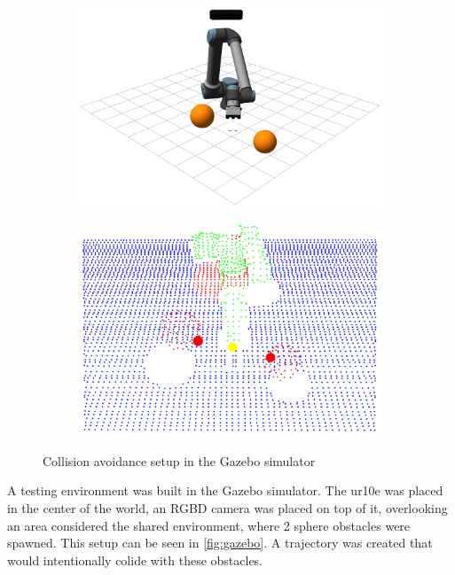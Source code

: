 \begin{figure}[h]
    \centering
    \begin{subfigure}{.5\linewidth}
      \centering
      \includegraphics[width=\linewidth]{figs/chp4/col_avoid_gazebo_mid.png}
    \end{subfigure}%
    \begin{subfigure}{.5\linewidth}
      \centering
      \includegraphics[width=0.9\linewidth]{figs/chp4/col_avoid_pcl.png}
    \end{subfigure}
    \caption{Collision avoidance setup in the Gazebo simulator}
    \label{fig:gazebo}
\end{figure}

\par A testing environment was built in the Gazebo simulator. The \ac{ur10e} was placed in the center of the world, an RGBD camera was placed on top of it, overlooking an area considered the shared environment, where 2 sphere obstacles were spawned. This setup can be seen in \autoref{fig:gazebo}. A trajectory was created that would intentionally colide with these obstacles. 

